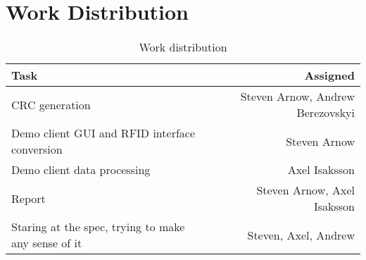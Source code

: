 \section{Work Distribution}
\begin{table}[h]
\centering
\begin{tabular}{| l | r |}
	\hline
	Task & Assigned \\\hline
	CRC generation & Steven Arnow, Andrew Berezovskyi \\ \hline
	Demo client GUI and RFID interface conversion & Steven Arnow \\ \hline
	Demo client data processing & Axel Isaksson \\ \hline

	Report & Steven Arnow, Axel Isaksson \\ \hline
	Staring at the spec, trying to make any sense of it & Steven, Axel, Andrew \\ \hline
	
	\hline
\end{tabular}
\caption{Work distribution}
\label{tab:work}
\end{table}
